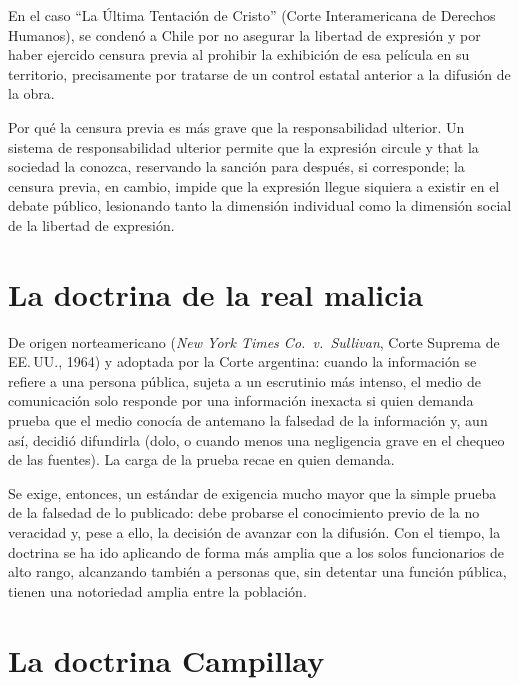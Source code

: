 \documentclass[12pt,oneside]{book}
\begin{document}
\begin{exbox}
En el caso ``La Última Tentación de Cristo'' (Corte Interamericana de Derechos
Humanos), se condenó a Chile por no asegurar la libertad de expresión y por haber
ejercido censura previa al prohibir la exhibición de esa película en su
territorio, precisamente por tratarse de un control estatal anterior a la
difusión de la obra.
\end{exbox}

\begin{impbox}
Por qué la censura previa es más grave que la responsabilidad ulterior. Un
sistema de responsabilidad ulterior permite que la expresión circule y that la
sociedad la conozca, reservando la sanción para después, si corresponde; la
censura previa, en cambio, impide que la expresión llegue siquiera a existir en el
debate público, lesionando tanto la dimensión individual como la dimensión social
de la libertad de expresión.
\end{impbox}

\section{La doctrina de la real malicia}

\begin{defbox}
De origen norteamericano (\textit{New York Times Co.\ v.\ Sullivan}, Corte
Suprema de EE.\,UU., 1964) y adoptada por la Corte argentina: cuando la
información se refiere a una persona pública, sujeta a un escrutinio más
intenso, el medio de comunicación solo responde por una información inexacta si
quien demanda prueba que el medio conocía de antemano la falsedad de la
información y, aun así, decidió difundirla (dolo, o cuando menos una negligencia
grave en el chequeo de las fuentes). La carga de la prueba recae en quien demanda.
\end{defbox}

Se exige, entonces, un estándar de exigencia mucho mayor que la simple prueba de
la falsedad de lo publicado: debe probarse el conocimiento previo de la no
veracidad y, pese a ello, la decisión de avanzar con la difusión. Con el tiempo,
la doctrina se ha ido aplicando de forma más amplia que a los solos funcionarios
de alto rango, alcanzando también a personas que, sin detentar una función
pública, tienen una notoriedad amplia entre la población.

\section{La doctrina Campillay}
\end{document}
